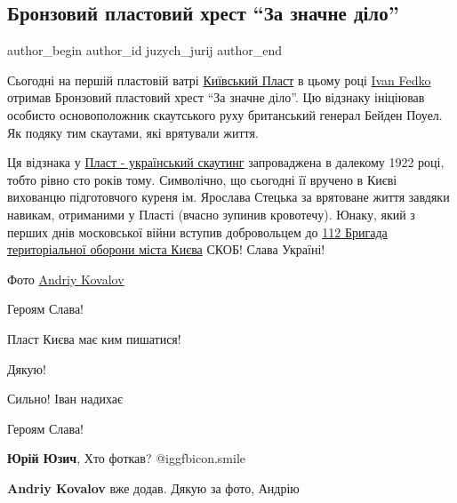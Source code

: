  
 
 
 
 
 
\subsection{Бронзовий пластовий хрест \enquote{За значне діло}}
\label{sec:12_04_2022.fb.juzych_jurij.1.plast_krest_nagrada}
 
\ifcmt
 author_begin
   author_id juzych_jurij
 author_end
\fi

Сьогодні на першій пластовій ватрі
\href{https://www.facebook.com/Kyiv.Plast}{Київський Пласт} в цьому році
\href{https://www.facebook.com/ivan.fedko.1238}{Ivan Fedko} отримав Бронзовий
пластовий хрест \enquote{За значне діло}. Цю відзнаку ініціював особисто
основоположник скаутського руху британський генерал Бейден Поуел. Як подяку тим
скаутами, які врятували життя. 


Ця відзнака у
\href{https://www.facebook.com/PlastUA}{Пласт - український скаутинг}
запроваджена в далекому 1922 році, тобто рівно сто років тому.  Символічно, що
сьогодні її вручено в Києві вихованцю підготовчого куреня ім.  Ярослава Стецька
за врятоване життя завдяки навикам, отриманими у Пласті (вчасно зупинив
кровотечу). Юнаку, який з перших днів московської війни вступив добровольцем до
\href{https://www.facebook.com/112btro}{112 Бригада територіальної оборони
міста Києва} СКОБ! Слава Україні!

Фото \href{https://www.facebook.com/andriy.kovalov}{Andriy Kovalov}

\begin{itemize} %
Героям Слава!

Пласт Києва має ким пишатися!

Дякую!

Сильно! Іван надихає

Героям Слава!

\textbf{Юрій Юзич}, Хто фоткав?  @igg{fbicon.smile} 

\textbf{Andriy Kovalov} вже додав. Дякую за фото, Андрію

\end{itemize} %
